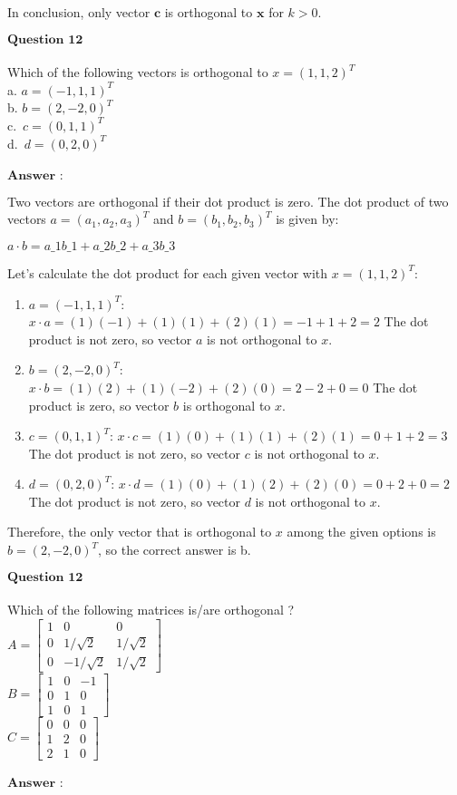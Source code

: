 \documentclass[11pt]{article}
\begin{document}
In conclusion, only vector $\mathbf{c}$ is orthogonal to
$\mathbf{x}$ for $k > 0$.

    $\textbf{Question 12}$\\
~\\
Which of the following vectors is orthogonal to $x=(1,1,2)^T$\\
a. $a=(-1,1,1)^T$\\
b. $b=(2,-2,0)^T$\\
c.~$c=(0,1,1)^T$\\
d.~$d=(0,2,0)^T$\\
~\\
$\textbf{Answer :}$

    Two vectors are orthogonal if their dot product is zero. The dot product
of two vectors $a = (a_1, a_2, a_3)^T$ and $b = (b_1, b_2, b_3)^T$
is given by:

$ a \cdot b = a\_1b\_1 + a\_2b\_2 + a\_3b\_3 $

Let's calculate the dot product for each given vector with
$x = (1, 1, 2)^T$:

\begin{enumerate}
\def\labelenumi{\alph{enumi}.}
\item
  $a = (-1, 1, 1)^T$: $ x \cdot a = (1)(-1) + (1)(1) + (2)(1) = -1 +
  1 + 2 = 2 $ The dot product is not zero, so vector $a$ is not
  orthogonal to $x$.
\item
  $b = (2, -2, 0)^T$: $ x \cdot b = (1)(2) + (1)(-2) + (2)(0) = 2 - 2
  + 0 = 0 $ The dot product is zero, so vector $b$ is orthogonal to
  $x$.
\item
  $c = (0, 1, 1)^T$: $ x \cdot c = (1)(0) + (1)(1) + (2)(1) = 0 + 1 +
  2 = 3 $ The dot product is not zero, so vector $c$ is not
  orthogonal to $x$.
\item
  $d = (0, 2, 0)^T$: $ x \cdot d = (1)(0) + (1)(2) + (2)(0) = 0 + 2 +
  0 = 2 $ The dot product is not zero, so vector $d$ is not
  orthogonal to $x$.
\end{enumerate}

Therefore, the only vector that is orthogonal to $x$ among the given
options is $b = (2, -2, 0)^T$, so the correct answer is b.

    $\textbf{Question 12}$\\
~\\
Which of the following matrices is/are orthogonal ?\\
$A=\begin{bmatrix} 1 & 0 & 0 \\ 0 & 1/\sqrt{2} & 1/\sqrt{2} \\ 0 & -1/\sqrt{2} & 1/\sqrt{2} \end{bmatrix}$\\
$B=\begin{bmatrix} 1 & 0 & -1 \\ 0 & 1 & 0 \\ 1 & 0 & 1 \end{bmatrix}$\\
$C=\begin{bmatrix} 0 & 0 & 0 \\ 1 & 2 & 0 \\ 2 & 1 & 0 \end{bmatrix}$\\
~\\
$\textbf{Answer :}$
\end{document}

